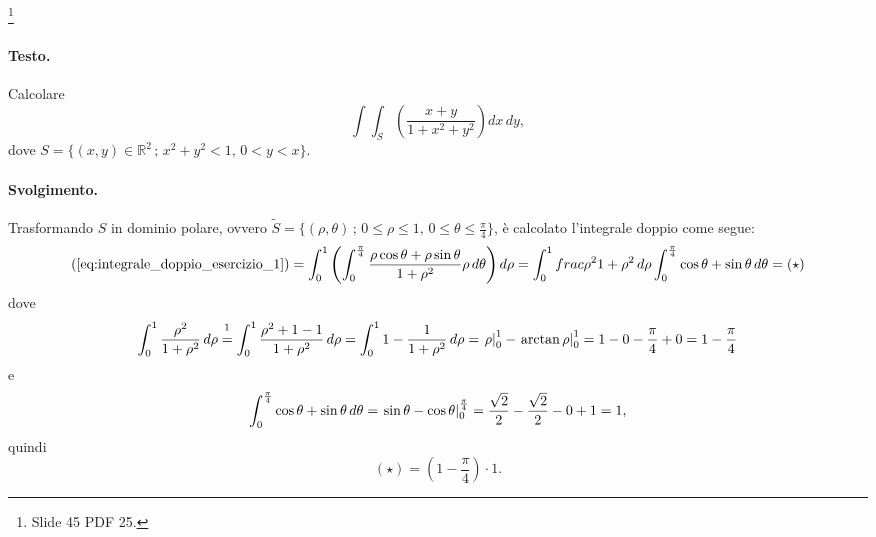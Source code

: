 \begin{example}\footnote{Slide 45 PDF 25.}
	\paragraph{Testo.} Calcolare
	\begin{equation}\label{eq:integrale_doppio_esercizio_1}
		\int\int_S\left(\frac{x+y}{1+x^2+y^2}\right) dx\, dy,
	\end{equation}
	dove $S=\{(x,y)\in\mathbb{R}^2\,;\, x^2+y^2 < 1,\, 0 < y < x\}$.
	\paragraph{Svolgimento.}Trasformando $S$ in dominio polare, ovvero $\tilde{S}=\{(\rho,\theta)\,;\, 0\leq \rho\leq 1,\, 0\leq \theta\leq \frac{\pi}{4}\}$, è calcolato l'integrale doppio come segue:
	\begin{equation*}
		(\ref{eq:integrale_doppio_esercizio_1}) = \int_0^1\left(\int_0^{\frac{\pi}{4}} \frac{\rho\cos\theta + \rho\sin\theta}{1 + \rho^2}\rho\, d\theta\right)d\rho = \int_0^1 	frac{\rho^2}{1+\rho^2}\,d\rho \int_0^{\frac{\pi}{4}} \cos\theta + \sin\theta\, d\theta = (\star)
	\end{equation*}
	dove
	\begin{equation*}
		\int_0^1 \frac{\rho^2}{1+\rho^2}\,d\rho \overset{\footnotemark}{=} \int_0^1 \frac{\rho^2+1-1}{1+\rho^2}\,d\rho = \int_0^1 1- \frac{1}{1+\rho^2}\,d\rho = \eval{\rho}{0}{1} - \eval{\arctan\rho}{0}{1} = 1 - 0 -\frac{\pi}{4} + 0 = 1- \frac{\pi}{4}
	\end{equation*}
	e
	\begin{equation*}
		\int_0^{\frac{\pi}{4}} \cos\theta + \sin\theta\, d\theta = \left.\sin\theta - \cos\theta\right\rvert_{0}^{\frac{\pi}{4}} = \frac{\sqrt{2}}{2} - \frac{\sqrt{2}}{2} - 0 + 1 = 1,
	\end{equation*}
	quindi
	\begin{equation*}
		(\star) = \left(1-\frac{\pi}{4}\right)\cdot 1.
	\end{equation*}
\end{example}




